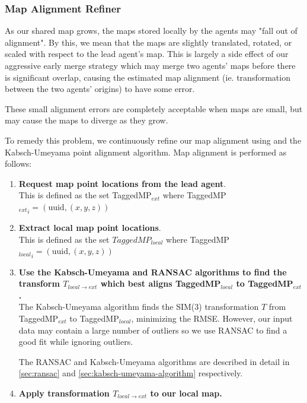 \subsubsection{Map Alignment Refiner}
\label{sec:map-alignment-refiner}
As our shared map grows, the maps stored locally by the agents may "fall out of alignment". By this, we mean that the maps are slightly translated, rotated, or scaled with respect to the lead agent's map. This is largely a side effect of our aggressive early merge strategy which may merge two agents' maps before there is significant overlap, causing the estimated map alignment (ie. transformation between the two agents' origins) to have some error.

These small alignment errors are completely acceptable when maps are small, but may cause the maps to diverge as they grow.

To remedy this problem, we continuously refine our map alignment using  and the Kabsch-Umeyama point alignment algorithm. Map alignment is performed as follows:

\begin{enumerate}
    \item \textbf{Request map point locations from the lead agent}. \\
          This is defined as the set TaggedMP$_{ext}$ where TaggedMP${_{ext}}_i = (\text{uuid}, (x, y, z))$
    \item \textbf{Extract local map point locations}. \\
          This is defined as the set $TaggedMP_{local}$ where TaggedMP${_{local}}_i = (\text{uuid}, (x, y, z))$
    \item \textbf{Use the Kabsch-Umeyama and RANSAC algorithms to find the transform $T_{local \to ext}$ which best aligns TaggedMP$_{local}$ to TaggedMP$_{ext}$.} \\
          The Kabsch-Umeyama algorithm finds the SIM(3) transformation $T$ from TaggedMP$_{ext}$ to TaggedMP$_{local}$, minimizing the RMSE. However, our input data may contain a large number of outliers so we use RANSAC to find a good fit while ignoring outliers.

          The RANSAC and Kabsch-Umeyama algorithms are described in detail in \autoref{sec:ransac} and \autoref{sec:kabsch-umeyama-algorithm} respectively.
    \item \textbf{Apply transformation $T_{local \to ext}$ to our local map.}
\end{enumerate}

